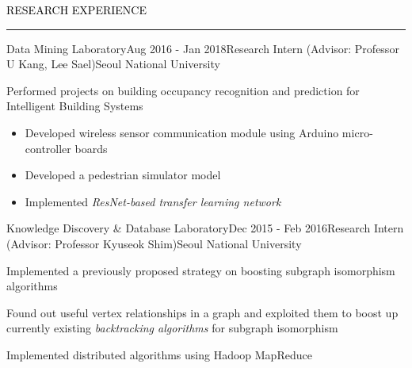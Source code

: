 \documentclass{resume} %
\renewenvironment{rSection}[1]{
	\sectionskip
	\textcolor{Black}{\MakeUppercase{#1}}
	\sectionlineskip
	\hrule
	\begin{list}{}{
			\setlength{\leftmargin}{1.5em}
		}
		\item[]
	}{
	\end{list}
}
\begin{document}
\begin{rSection}{Research Experience}
\begin{rSubsection}{Data Mining Laboratory}{Aug 2016 - Jan 2018}{Research Intern (Advisor: Professor U Kang, Lee Sael)}{Seoul National University}
\begin{itemize}
	\end{itemize}
	\item Performed projects on building occupancy recognition and prediction for Intelligent Building Systems
	\begin{itemize}
		\vspace*{-2.0mm}
		\item Developed wireless sensor communication module using Arduino micro-controller boards
		\vspace*{-2.0mm}
		\item Developed a pedestrian simulator model
		\vspace*{-2.0mm}
		\item Implemented \em{ResNet}\em-based transfer learning network
	\end{itemize}
\end{rSubsection}
\vspace*{-2.0mm}

\begin{rSubsection}{Knowledge Discovery \& Database Laboratory}{Dec 2015 - Feb 2016}{Research Intern (Advisor: Professor Kyuseok Shim)}{Seoul National University}
	\item Implemented a previously proposed strategy on boosting subgraph isomorphism algorithms
	\item Found out useful vertex relationships in a graph and exploited them to boost up currently existing \textit{backtracking algorithms} for subgraph isomorphism
	\item Implemented distributed algorithms using Hadoop MapReduce
\end{rSubsection}

\end{rSection}


\end{document}
